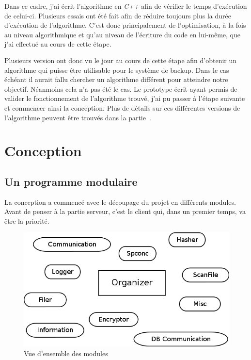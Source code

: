 \documentclass[a4paper,10pt, twoside]{report}
\begin{document}
\begin{spacing}{1.2}
Dans ce cadre, j'ai \'ecrit l'algorithme en \textit{C++} afin de v\'erifier
le temps d'ex\'ecution de celui-ci. Plusieurs essais ont \'et\'e fait afin de
r\'eduire toujours plus la dur\'ee d'ex\'ecution de l'algorithme. C'est donc
principalement de l'optimisation, \`a la fois au niveau algorithmique et
qu'au niveau de l'\'ecriture du code en lui-m\^eme, que j'ai effectu\'e  au
cours de cette \'etape.

Plusieurs version ont donc vu le jour au cours de cette \'etape afin d'obtenir
un algorithme qui puisse \^etre utilisable pour le syst\`eme de backup. Dans
le cas \'ech\'eant il aurait fallu chercher un algorithme diff\'erent pour
atteindre notre objectif. N\'eanmoins cela n'a pas \'et\'e le cas. Le
prototype \'ecrit ayant permis de valider le fonctionnement de l'algorithme
trouv\'e, j'ai pu passer \`a l'\'etape suivante et commencer ainsi la
conception.
Plus de d\'etails sur ces diff\'erentes versions de l'algorithme peuvent \^etre
trouv\'es dans la partie~.

\section{Conception}
\subsection{Un programme modulaire}
La conception a commenc\'e avec le d\'ecoupage du projet en diff\'erents
modules. Avant de penser \`a la partie serveur, c'est le client qui, dans un
premier temps, va \^etre la priorit\'e.

\begin{figure}[h!]
  \centering
  \includegraphics[scale=0.51]{softwareDesign/overviewModule.png}
  \caption{\label{overviewModule} Vue d'ensemble des modules}
\end{figure}


\end{spacing}
\end{document}
